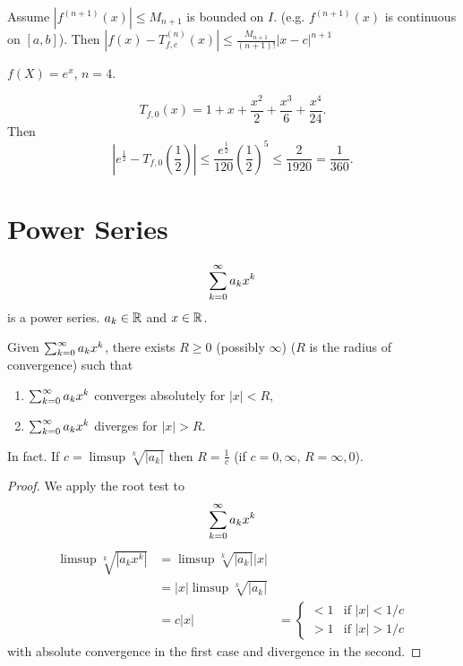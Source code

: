 \documentclass[10pt, a4paper]{article}
\begin{document}
Assume $\left|f ^ {(n + 1)}(x)\right| \leq M_{n + 1}$ is bounded on $I$.
(e.g. $f ^ {(n + 1)}(x)$ is continuous on $[a, b]$).
Then $\left|f(x) - T_{f, c}^{(n)}(x)\right| \leq \frac{M_{n + 1}}{(n + 1)!}|x - c| ^ {n + 1}$

\begin{example}
    $f(X) = e ^ x$,
    $n = 4$.

    \[
    T_{f, 0}(x) = 1 + x + \frac{x ^ 2}{2} + \frac{x ^ 3}{6} + \frac{x ^ 4}{24}.
    \]
    Then
    \[
    \left|e ^ {\frac{1}{2}} - T_{f, 0}\left(\frac{1}{2}\right)\right| \leq \frac{e ^ {\frac{1}{2}}}{120}\left(\frac{1}{2}\right) ^ 5 \leq \frac{2}{1920} = \frac{1}{360}.
    \]
\end{example}

\newpage

\section{Power Series}

\begin{definition}
    \[
    \sum_{k = 0}^{\infty} a_kx ^ k
    \]
    is a power series.
    $a_k \in \mathbb{R}$ and $x \in \mathbb{R}$.
\end{definition}

\begin{theorem}
    Given $\sum_{k = 0}^{\infty} a_kx ^ k$,
    there exists $R \geq 0$
    (possibly $\infty$)
    ($R$ is the radius of convergence)
    such that
    \begin{enumerate}[label = (\roman*)]
        \item $\sum_{k = 0}^{\infty} a_kx ^ k$ converges absolutely for $|x| < R$,

        \item $\sum_{k = 0}^{\infty} a_kx ^ k$ diverges for $|x| > R$.
    \end{enumerate}
    In fact.
    If $c = \limsup\sqrt[k]{|a_k|}$ then $R = \frac{1}{c}$
    (if $c = 0, \infty$,
    $R = \infty, 0$).
    
    \begin{proof}
        We apply the root test to
        \[
        \sum_{k = 0}^{\infty} a_kx ^ k
        \]
        \begin{align*}
            \limsup\sqrt[k]{|a_kx ^ k|} &= \limsup\sqrt[k]{|a_k|}|x| \\
            &= |x|\limsup\sqrt[k]{|a_k|} \\
            &= c|x| &= \begin{cases}
                < 1 & \text{if } |x| < 1 / c \\
                > 1 & \text{if } |x| > 1 / c
            \end{cases}
        \end{align*}
        with absolute convergence in the first case and divergence in the second.
    \end{proof}
\end{theorem}
\end{document}
